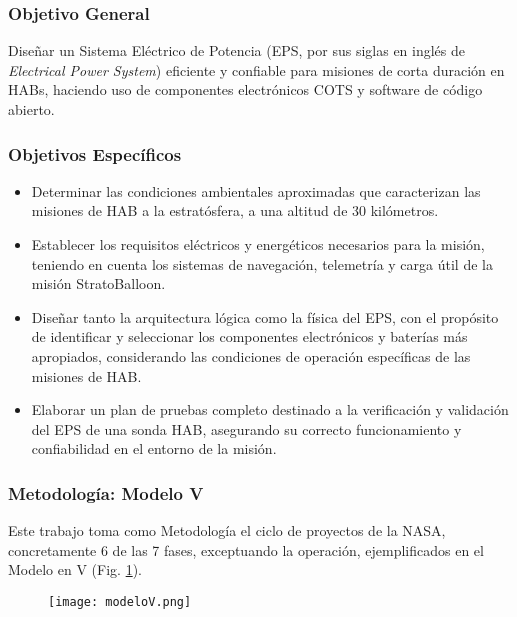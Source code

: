 
\begin{frame}
\frametitle{Objetivo General}

Diseñar un Sistema Eléctrico de Potencia (EPS, por sus siglas en inglés de \emph{Electrical Power System}) eficiente y confiable para misiones de corta duración en HABs, haciendo uso de componentes electrónicos COTS y software de código abierto.

\end{frame}


\begin{frame}
    \frametitle{Objetivos Específicos}

\begin{itemize}
    \small
    \item Determinar las condiciones ambientales aproximadas que caracterizan las
    misiones de HAB a la estratósfera, a una altitud de 30 kilómetros.
    \item Establecer los requisitos eléctricos y energéticos necesarios para la misión,
    teniendo en cuenta los sistemas de navegación, telemetría y carga útil de la
    misión StratoBalloon.
    \item Diseñar tanto la arquitectura lógica como la física del EPS, con el propósito
    de identificar y seleccionar los componentes electrónicos y baterías más apropiados,
    considerando las condiciones de operación específicas de las misiones
    de HAB.
    \item Elaborar un plan de pruebas completo destinado a la verificación y validación
    del EPS de una sonda HAB, asegurando su correcto funcionamiento y
    confiabilidad en el entorno de la misión.
\end{itemize}

\end{frame}


\begin{frame}
\frametitle{Metodología: Modelo V}
Este trabajo toma como Metodología el ciclo de proyectos de la NASA, concretamente 6 de las 7 fases, exceptuando la operación, ejemplificados en el Modelo en V (Fig. \ref{fig:ModeloV}).

\begin{figure}[H]
    \centering
    \texttt{[image: modeloV.png]} %
    \label{fig:ModeloV}
\end{figure}

\end{frame}

